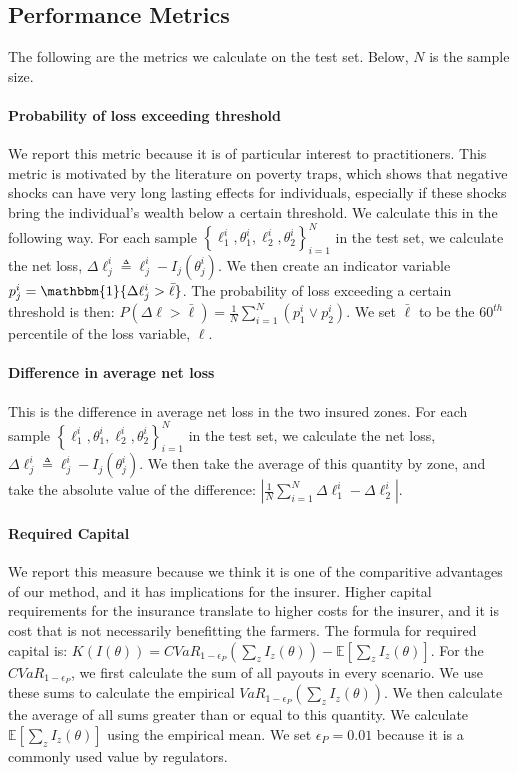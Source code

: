 \documentclass[11pt]{article}
\begin{document}
  \subsection{Performance Metrics}
    The following are the metrics we calculate on the test set. Below, $N$ is the sample size. 

    \paragraph*{Probability of loss exceeding threshold} We report this metric because it is of particular interest to practitioners. This metric is motivated by the literature on poverty traps, which shows that negative shocks can have very long lasting effects for individuals, especially if these shocks bring the individual's wealth below a certain threshold. We calculate this in the following way. For each sample $\left \{\ell^i_1,\theta^i_1, \ell^i_2, \theta^i_2 \right \}_{i=1}^N$ in the test set, we calculate the net loss, $\Delta \ell_j^i \triangleq  \ell^i_j - I_j(\theta^i_j)$. We then create an indicator variable $p^i_j =  \mathbbm{1}\{ \Delta \ell^i_j > \bar{\ell} \}$. The probability of loss exceeding a certain threshold is then: $P(\Delta \ell > \bar{\ell}) = \frac{1}{N}\sum_{i=1}^N (p^i_1 \lor p^i_2)$. We set $\bar{\ell}$ to be the $60^{th}$ percentile of the loss variable, $\ell$.
    
    \paragraph*{Difference in average net loss} This is the difference in average net loss in the two insured zones. For each sample $\left \{\ell^i_1,\theta^i_1, \ell^i_2, \theta^i_2 \right \}_{i=1}^N$ in the test set, we calculate the net loss, $\Delta \ell^i_j \triangleq  \ell^i_j - I_j(\theta^i_j)$. We then take the average of this quantity by zone, and take the absolute value of the difference: $\left |\frac{1}{N}\sum_{i=1}^N \Delta \ell^i_1 - \Delta \ell^i_2 \right |$.

    \paragraph*{Required Capital} We report this measure because we think it is one of the comparitive advantages of our method, and it has implications for the insurer. Higher capital requirements for the insurance translate to higher costs for the insurer, and it is cost that is not necessarily benefitting the farmers. The formula for required capital is: $K(I(\theta)) = CVaR_{1-\epsilon_P}(\sum_z I_z(\theta)) - \mathbb{E}[\sum_z I_z(\theta)]$. For the $CVaR_{1-\epsilon_P}$, we first calculate the sum of all payouts in every scenario. We use these sums to calculate the empirical $VaR_{1-\epsilon_P}(\sum_z I_z(\theta))$. We then calculate the average of all sums greater than or equal to this quantity. We calculate $\mathbb{E}[\sum_z I_z(\theta)]$ using the empirical mean. We set $\epsilon_P = 0.01$ because it is a commonly used value by regulators. 
\end{document}
